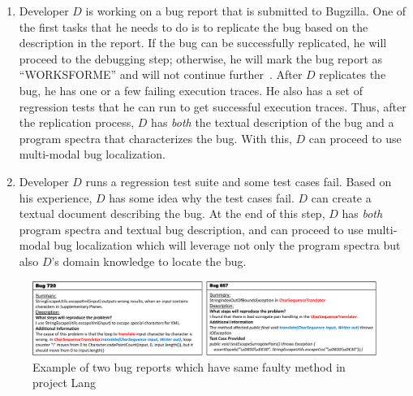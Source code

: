 \begin{enumerate}
	\item Developer $D$ is working on a bug report that is submitted to Bugzilla. One of the first tasks that he needs to do is to replicate the bug based on the description in the report. If the bug can be successfully replicated, he will proceed to the debugging step; otherwise, he will mark the bug report as ``WORKSFORME'' and will not continue further~\cite{worksforme}. After $D$ replicates the bug, he has one or a few failing execution traces. He also has a set of regression tests that he can run to get successful execution traces. Thus, after the replication process, $D$ has {\em both} the textual description of the bug and a program spectra that characterizes the bug. With this, $D$ can proceed to use multi-modal bug localization.
	\item  Developer $D$ runs a regression test suite and some test cases fail. Based on his experience, $D$ has some idea why the test cases fail. $D$ can create a textual document describing the bug. At the end of this step, $D$ has {\em both} program spectra and textual bug description, and can proceed to use multi-modal bug localization which will leverage not only the program spectra but also $D$'s domain knowledge to locate the bug.
\end{enumerate}


\begin{figure}[!t]
	\centering
	\includegraphics[width=\textwidth]{bug_example.pdf}
	\caption{Example of two bug reports which have same faulty method in project Lang}
	\label{fig:bug_motivation}
\end{figure}

